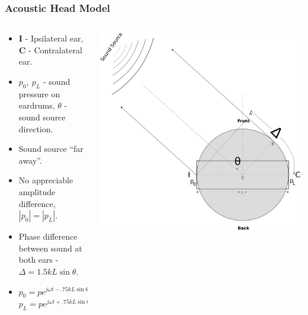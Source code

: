 \documentclass{beamer}
\begin{document}
\begin{frame}[t]
 \frametitle{Acoustic Head Model}
 \begin{columns}
     \begin{column}{.5\textwidth}
    \small
    \flushleft
     \begin{itemize}
      \item<1> \textbf{I} - Ipsilateral ear, \textbf{C} - Contralateral ear.
      \item<1>  $p_0,\ p_L$ - sound pressure on eardrums,
      $\theta$ - sound source direction.
     \end{itemize}
     
     \begin{itemize}
      \item<2> Sound source ``far away''.
      \item<2> No appreciable amplitude difference, $|p_0|=|p_L|$.
      \item<2> Phase difference between sound at both ears - $\Delta=1.5kL\sin\theta$.
      \item<3> $p_0=pe^{j\omega t -.75kL\sin\theta}$\\ $p_L=pe^{j\omega t +.75kL\sin\theta}$
      \end{itemize}

    \end{column}
    
 \begin{column}{0.5\textwidth}
    \includegraphics[width = 6 cm]{Diagrams/Presentation/acousticheadmodel2.png}\\
    \end{column}

    \end{columns}
\end{frame}
\end{document}
